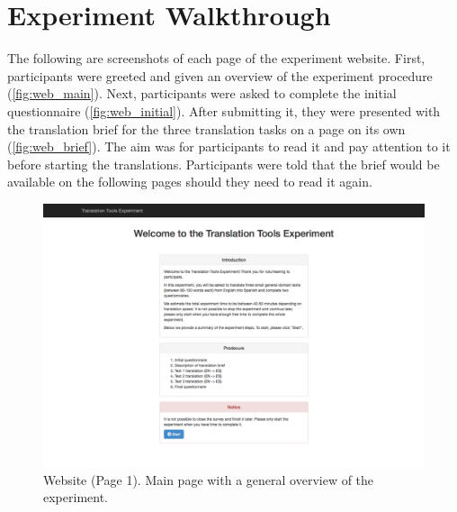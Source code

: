 
\chapter{Experiment Walkthrough}
\label{an:walkthrough}


\noindent The following are screenshots of each page of the experiment website. First, participants were greeted and given an overview of the experiment procedure (\autoref{fig:web_main}). Next, participants were asked to complete the initial questionnaire (\autoref{fig:web_initial}). After submitting it, they were presented with the translation brief for the three translation tasks on a page on its own (\autoref{fig:web_brief}). The aim was for participants to read it and pay attention to it before starting the translations. Participants were told that the brief would be available on the following pages should they need to read it again.

\begin{figure}[h]
\myfloatalign
\includegraphics[width=\textwidth]{img/web/web_1.png}
\caption{Website (Page 1). Main page with a general overview of the experiment.}
\label{fig:web_main}
\end{figure}

